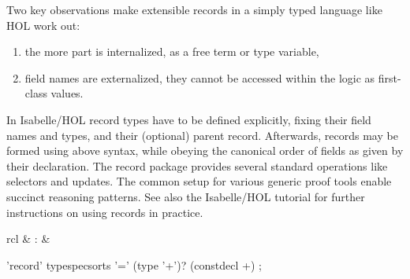 \begin{isabellebody}
\begin{isamarkuptext}
  \medskip Two key observations make extensible records in a simply
  typed language like HOL work out:

  \begin{enumerate}

  \item the more part is internalized, as a free term or type
  variable,

  \item field names are externalized, they cannot be accessed within
  the logic as first-class values.

  \end{enumerate}

  \medskip In Isabelle/HOL record types have to be defined explicitly,
  fixing their field names and types, and their (optional) parent
  record.  Afterwards, records may be formed using above syntax, while
  obeying the canonical order of fields as given by their declaration.
  The record package provides several standard operations like
  selectors and updates.  The common setup for various generic proof
  tools enable succinct reasoning patterns.  See also the Isabelle/HOL
  tutorial \cite{isabelle-hol-book} for further instructions on using
  records in practice.%
\end{isamarkuptext}%
\isamarkuptrue%
%
\isamarkuptrue%
%
\begin{isamarkuptext}%
\begin{matharray}{rcl}
    \hypertarget{command.HOL.record}{\hyperlink{command.HOL.record}{\mbox{}}} & : &  \\
  \end{matharray}

  \begin{rail}
    'record' typespecsorts '=' (type '+')? (constdecl +)
    ;
  \end{rail}

  \begin{description}


\end{description}
\end{isamarkuptext}
\end{isabellebody}

